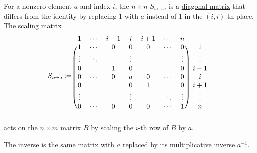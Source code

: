 \begin{definition}
\begin{thmenum}
     For a nonzero element \( a \) and index \( i \), the \( n \times n \)  \( S_{i \mapsto a} \) is a \hyperref[def:matrix_diagonal]{diagonal matrix} that differs from the identity by replacing \( 1 \) with \( a \) instead of \( 1 \) in the \( (i, i) \)-th place. The scaling matrix
    \begin{equation*}
      S_{i \mapsto a}
      \coloneqq
      \begin{blockarray}{*{7}{c} c}
        1      & \cdots & {i-1}   & i      & {i+1}  & \cdots & n      &        \\
      \begin{block}{(*{7}{c}) c}
        1      & \cdots & 0       & 0      & 0      & \cdots & 0      & 1      \\
        \vdots & \ddots &         & \vdots &        &        & \vdots & \vdots \\
        0      &        & 1       & 0      &        &        & 0      & {i-1}  \\
        0      & \cdots & 0       & a      & 0      & \cdots & 0      & i      \\
        0      &        &         & 0      & 1      &        & 0      & {i+1}  \\
        \vdots &        &         & \vdots &        & \ddots & \vdots & \vdots \\
        0      & \cdots & 0       & 0      & 0      & \cdots & 1      & n      \\
      \end{block}
      \end{blockarray}
    \end{equation*}
    acts on the \( n \times m \) matrix \( B \) by scaling the \( i \)-th row of \( B \) by \( a \).

    The inverse is the same matrix with \( a \) replaced by its multiplicative inverse \( a^{-1} \).


\end{thmenum}
\end{definition}
